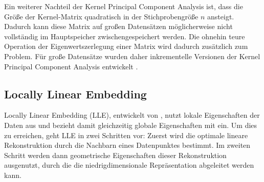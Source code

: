 Ein weiterer Nachteil der Kernel Principal Component Analysis ist, dass die Größe der Kernel-Matrix
quadratisch in der Stichprobengröße $n$ ansteigt. Dadurch kann diese Matrix auf großen Datensätzen
möglicherweise nicht vollständig im Hauptspeicher zwischengespeichert werden. Die ohnehin teure
Operation der Eigenwertszerlegung einer Matrix wird dadurch zusätzlich zum Problem. Für große
Datensätze wurden daher inkrementelle Versionen der Kernel Principal Component Analysis entwickelt \parencite[siehe z.B.][]{Hallgren.2018}.

\subsection{Locally Linear Embedding}
\label{ch:MethodenDerDimRed:statistisch:LLE}
Locally Linear Embedding (LLE), entwickelt von \textcite{Roweis.2000}, nutzt lokale Eigenschaften der Daten aus und bezieht damit gleichzeitig globale Eigenschaften mit ein. Um dies zu erreichen, geht LLE in zwei Schritten vor: Zuerst wird die optimale lineare Rekonstruktion durch die Nachbarn eines Datenpunktes bestimmt. Im zweiten Schritt werden dann geometrische Eigenschaften dieser Rekonstruktion ausgenutzt, durch die die niedrigdimensionale Repräsentation abgeleitet werden kann.

